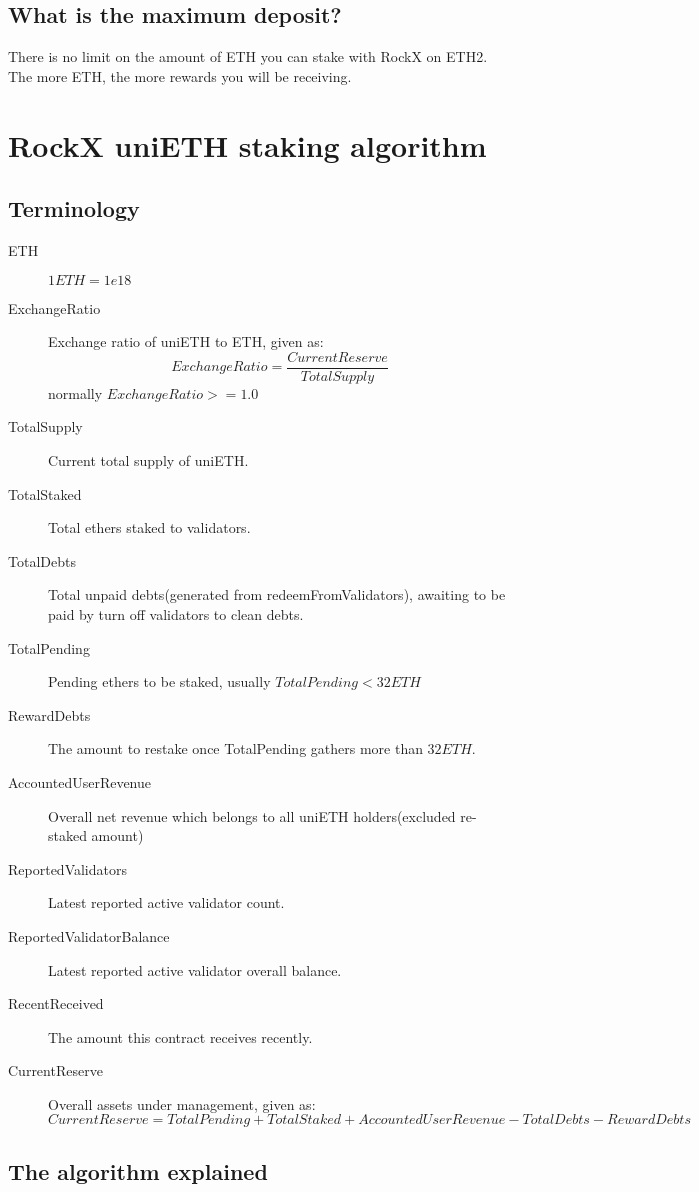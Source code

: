 \documentclass{article}
\begin{document}
\subsection{What is the maximum deposit?}
There is no limit on the amount of ETH you can stake with RockX on ETH2. The more ETH, the more rewards you will be receiving.

\section{RockX uniETH staking algorithm}

\subsection{Terminology}
\begin{description}
   \item[ETH] $1 ETH = 1e18$
   \item[ExchangeRatio] Exchange ratio of uniETH to ETH, given as: 
    \[ExchangeRatio = \frac{CurrentReserve}{TotalSupply}\]
    normally $ExchangeRatio >= 1.0$
   \item[TotalSupply] Current total supply of uniETH.
   \item[TotalStaked] Total ethers staked to validators.
   \item[TotalDebts] Total unpaid debts(generated from redeemFromValidators), awaiting to be paid by turn off validators to clean debts.
   \item[TotalPending] Pending ethers to be staked, usually $TotalPending <32ETH$
   \item[RewardDebts] The amount to restake once TotalPending gathers more than $32ETH$.
   \item[AccountedUserRevenue] Overall net revenue which belongs to all uniETH holders(excluded re-staked amount)
   \item[ReportedValidators] Latest reported active validator count.
   \item[ReportedValidatorBalance] Latest reported active validator overall balance.
   \item[RecentReceived] The amount this contract receives recently.
   \item[CurrentReserve] Overall assets under management, given as:
   \[CurrentReserve = TotalPending + TotalStaked + AccountedUserRevenue - TotalDebts - RewardDebts\]
\end{description}

\subsection{The algorithm explained}
\newtheorem{theorem}{Theorem}[section]
\newtheorem{corollary}{Corollary}[theorem]
\newtheorem{lemma}[theorem]{Lemma}
\end{document}
